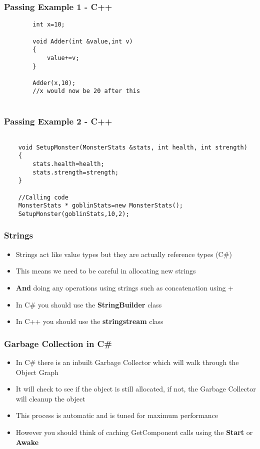 \begin{frame}[fragile]
	\frametitle{Passing Example 1 - C++}
	\begin{lstlisting}
		int x=10;
			
		void Adder(int &value,int v)
		{
			value+=v;	
		}
		
		Adder(x,10);
		//x would now be 20 after this		
		
	\end{lstlisting}
\end{frame}

\begin{frame}[fragile]
	\frametitle{Passing Example 2 - C++}
	\begin{lstlisting}
	
	void SetupMonster(MonsterStats &stats, int health, int strength)
	{
		stats.health=health;
		stats.strength=strength;
	}
	
	//Calling code
	MonsterStats * goblinStats=new MonsterStats();
	SetupMonster(goblinStats,10,2);
	\end{lstlisting}
\end{frame}

\begin{frame}
  \frametitle{Strings}
  \begin{itemize}
  \item Strings act like value types but they are actually reference types (C\#)
  \item This means we need to be careful in allocating new strings
  \item \textbf{And} doing any operations using strings such as concatenation using +
  \item In C\# you should use the \textbf{StringBuilder} class 
  \item In C++ you should use the \textbf{stringstream} class
  \end{itemize}
\end{frame}
	
\begin{frame}
	\frametitle{Garbage Collection in C\#}
  	\begin{itemize}
  	\item In C\# there is an inbuilt Garbage Collector which will  walk through the Object Graph
	\item It will check to see if the object is still allocated, if not, the Garbage Collector will cleanup the object
	\item This process is automatic and is tuned for maximum performance
	\item However you should think of caching GetComponent calls using the \textbf{Start} or \textbf{Awake}
  	\end{itemize}
\end{frame}

